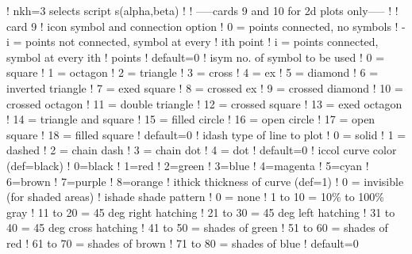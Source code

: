 \begin{ccode}
   !           nkh=3 selects script s(alpha,beta)
   !
   ! -----cards 9 and 10 for 2d plots only-----
   !
   !  card 9
   !     icon          symbol and connection option
   !                     0 = points connected, no symbols
   !                    -i = points not connected, symbol at every
   !                         ith point
   !                     i = points connected, symbol at every ith
   !                         points
   !                     default=0
   !     isym          no. of symbol to be used
   !                     0 = square
   !                     1 = octagon
   !                     2 = triangle
   !                     3 = cross
   !                     4 = ex
   !                     5 = diamond
   !                     6 = inverted triangle
   !                     7 = exed square
   !                     8 = crossed ex
   !                     9 = crossed diamond
   !                     10 = crossed octagon
   !                     11 = double triangle
   !                     12 = crossed square
   !                     13 = exed octagon
   !                     14 = triangle and square
   !                     15 = filled circle
   !                     16 = open circle
   !                     17 = open square
   !                     18 = filled square
   !                     default=0
   !     idash         type of line to plot
   !                     0 = solid
   !                     1 = dashed
   !                     2 = chain dash
   !                     3 = chain dot
   !                     4 = dot
   !                     default=0
   !     iccol         curve color (def=black)
   !                     0=black
   !                     1=red
   !                     2=green
   !                     3=blue
   !                     4=magenta
   !                     5=cyan
   !                     6=brown
   !                     7=purple
   !                     8=orange
   !     ithick        thickness of curve (def=1)
   !                     0 = invisible (for shaded areas)
   !     ishade        shade pattern
   !                     0 = none
   !                     1 to 10 = 10\% to 100\% gray
   !                     11 to 20 = 45 deg right hatching
   !                     21 to 30 = 45 deg left hatching
   !                     31 to 40 = 45 deg cross hatching
   !                     41 to 50 = shades of green
   !                     51 to 60 = shades of red
   !                     61 to 70 = shades of brown
   !                     71 to 80 = shades of blue
   !                     default=0

\end{ccode}
